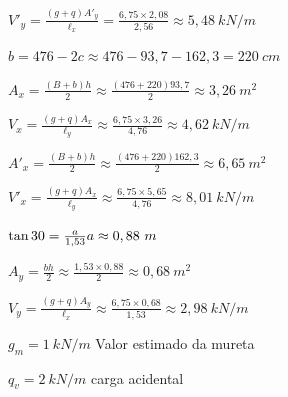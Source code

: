 \begin{resposta}
\begin{enumerate}[start=2]
\begin{enumerate}
            $V'_y=\frac{(g+q)A'_y}{\ell_x}=\frac{6,75\times 2,08}{2,56} \approx5,48 \ kN/m$ \newline


            

            $b=476-2c\approx476-93,7-162,3=220 \ cm$ \newline

            $A_x=\frac{(B+b)h}{2}\approx\frac{(476+220)93,7}{2}\approx3,26 \ m^2$ \newline

            $V_x=\frac{(g+q)A_x}{\ell_y}\approx\frac{6,75\times 3,26}{4,76}\approx4,62 \ kN/m$ \newline

            

            $A'_x=\frac{(B+b)h}{2}\approx\frac{(476+220)162,3}{2}\approx6,65 \ m^2$ \newline

            $V'_x=\frac{(g+q)A_x}{\ell_y}\approx\frac{6,75\times 5,65}{4,76}\approx8,01 \ kN/m$ \newline

            \paracasa



            

            

            $\tan 30 = \frac{a}{1,53} \newline a\approx0,88 \ m$ \newline

            $A_y=\frac{bh}{2}\approx\frac{1,53\times0,88}{2}\approx0,68\ m^2$ \newline

            $V_y=\frac{(g+q)A_y}{\ell_x}\approx\frac{6,75\times0,68}{1,53}\approx2,98\ kN/m$ \newline

            

            $g_m = 1 \ kN/m$ Valor estimado da mureta \cite[item 6.3]{nbr6120} 

            $q_v = 2 \ kN/m$ carga acidental \cite[tabela 10, índice j]{nbr6120} 


\end{enumerate}
\end{enumerate}
\end{resposta}
